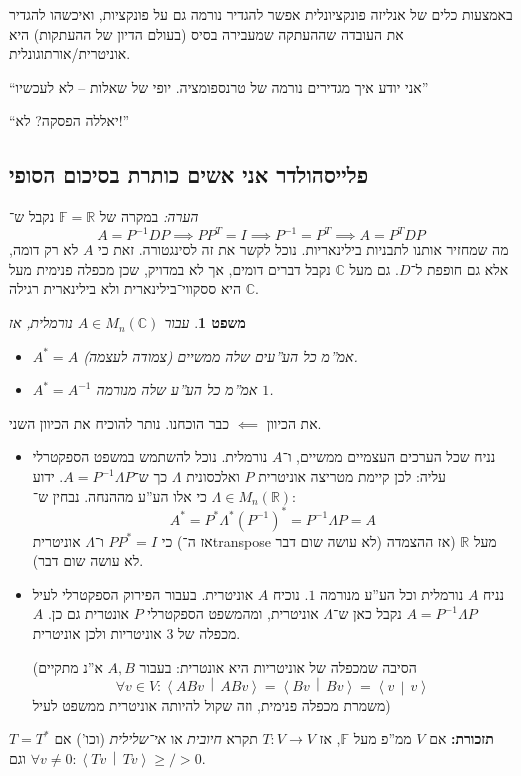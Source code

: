 \documentclass[]{article}
\newcommand\R     {\mathbb{R}}
\newcommand\C     {\mathbb{C}}
\newcommand\ra    {\rangle}
\newcommand\la    {\langle}
\newcommand\F         {\mathbb{F}}
\newcommand\co        {\colon}
\newcommand\mut[2]    {\left \la #1 \,\middle\vert\, #2 \right \ra}
\newcommand\Lg        {\Lambda}
\newcommand\op    {^{-1}}
\newtheorem{Theorem}{משפט}
\theoremstyle{definition}
\newcommand\theo  [1] {\begin{Theorem}#1\end{Theorem}}
\begin{document}
	
	באמצעות כלים של אנליזה פונקציונלית אפשר להגדיר נורמה גם על פונקציות, ואיכשהו להגדיר את העובדה שההעתקה שמעבירה בסיס (בעולם הדיון של ההעתקות) היא אוניטרית/אורתוגונלית. 
	
	``אני יודע איך מגדירים נורמה של טרנספומציה. יופי של שאלות – לא לעכשיו''
	
	``יאללה הפסקה? לא!''
	
	\subsection{פלייסהולדר אני אשים כותרת בסיכום הסופי}
	\textit{הערה: }במקרה של $\F= \R$ נקבל ש־
	\[ A = P\op DP \implies PP^T = I \implies P\op = P^T \implies A = P^TDP \]
	מה שמחזיר אותנו לתבניות בילינאריות. נוכל לקשר את זה לסינגטורה. זאת כי $A$ לא רק דומה, אלא גם חופפת ל־$D$. גם מעל $\C$ נקבל דברים דומים, אך לא במדויק, שכן מכפלה פנימית מעל $\C$ היא ססקווי־בילינארית ולא בילינארית רגילה. 
	
	\theo{עבור $A \in M_n(\C)$ נורמלית, אז
	\begin{itemize}
		\item $A^* = A$ (צמודה לעצמה) אמ''מ כל הע''עים שלה ממשיים. 
		\item $A^* = A\op$ אמ''מ כל הע''ע שלה מנורמה $1$. 
	\end{itemize}}
	את הכיוון $\impliedby$ כבר הוכחנו. נותר להוכיח את הכיוון השני. 
	\begin{itemize}
		\item נניח שכל הערכים העצמיים ממשיים, ו־$A$ נורמלית. נוכל להשתמש במשפט הספקטרלי עליה: לכן קיימת מטריצה אוניטרית $P$ ואלכסונית $\Lg$ כך ש־$A = P\op \Lg P$. ידוע $\Lg \in M_n(\R)$ כי אלו הע''ע מההנחה. נבחין ש־: 
		\[ A^* = P^* \Lg^* (P\op)^* = P\op \Lg P = A \]
		כי $PP^* =I$ ו־$\Lg$ אוניטרית (אז ה־transpose לא עושה שום דבר) מעל $\R$ (אז ההצמדה לא עושה שום דבר). 
		\item נניח $A$ נורמלית וכל הע''ע מנורמה $1$. נוכיח $A$ אוניטרית. בעבור הפירוק הספקטרלי לעיל $A = P\op \Lg P$ נקבל כאן ש־$\Lg$ אוניטרית, ומהמשפט הספקטרלי $P$ אונטרית גם כן. $A$ מכפלה של 3 אוניטריות ולכן אוניטרית. 
		
		(הסיבה שמכפלה של אוניטריות היא אונטרית: בעבור $A, B$ א''נ מתקיים
		\[ \forall v \in V \co \mut{ABv}{ABv} = \mut{Bv}{Bv} = \mut{v}{v} \]
		משמרת מכפלה פנימית, וזה שקול להיותה אוניטרית ממשפט לעיל)
	\end{itemize}
	
	\textbf{תזכורת: }אם $V$ ממ''פ מעל $\F$, אז $T \co V \to V$ תקרא \textit{חיובית} או \textit{אי־שלילית} (וכו') אם $T = T^*$ וגם $\forall v \neq 0 \co \mut{Tv}{Tv} \ge\!/\!> 0$. 
	
\end{document}
